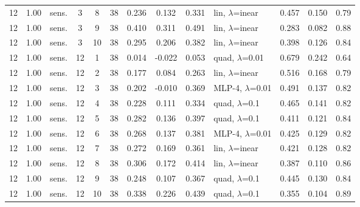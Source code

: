 \begin{scriptsize}
\begin{longtable}{cclcc c ccc l ccc}
12 & 1.00 & sens. & 3 & 8 & 38 & 0.236 & 0.132 & 0.331 & lin, $\lambda$=inear & 0.457 & 0.150 & 0.79 \\
12 & 1.00 & sens. & 3 & 9 & 38 & 0.410 & 0.311 & 0.491 & lin, $\lambda$=inear & 0.283 & 0.082 & 0.88 \\
12 & 1.00 & sens. & 3 & 10 & 38 & 0.295 & 0.206 & 0.382 & lin, $\lambda$=inear & 0.398 & 0.126 & 0.84 \\
12 & 1.00 & sens. & 12 & 1 & 38 & 0.014 & -0.022 & 0.053 & quad, $\lambda$=0.01 & 0.679 & 0.242 & 0.64 \\
12 & 1.00 & sens. & 12 & 2 & 38 & 0.177 & 0.084 & 0.263 & lin, $\lambda$=inear & 0.516 & 0.168 & 0.79 \\
12 & 1.00 & sens. & 12 & 3 & 38 & 0.202 & -0.010 & 0.369 & MLP-4, $\lambda$=0.01 & 0.491 & 0.137 & 0.82 \\
12 & 1.00 & sens. & 12 & 4 & 38 & 0.228 & 0.111 & 0.334 & quad, $\lambda$=0.1 & 0.465 & 0.141 & 0.82 \\
12 & 1.00 & sens. & 12 & 5 & 38 & 0.282 & 0.136 & 0.397 & quad, $\lambda$=0.1 & 0.411 & 0.121 & 0.84 \\
12 & 1.00 & sens. & 12 & 6 & 38 & 0.268 & 0.137 & 0.381 & MLP-4, $\lambda$=0.01 & 0.425 & 0.129 & 0.82 \\
12 & 1.00 & sens. & 12 & 7 & 38 & 0.272 & 0.169 & 0.361 & lin, $\lambda$=inear & 0.421 & 0.128 & 0.82 \\
12 & 1.00 & sens. & 12 & 8 & 38 & 0.306 & 0.172 & 0.414 & lin, $\lambda$=inear & 0.387 & 0.110 & 0.86 \\
12 & 1.00 & sens. & 12 & 9 & 38 & 0.248 & 0.107 & 0.367 & quad, $\lambda$=0.1 & 0.445 & 0.130 & 0.84 \\
12 & 1.00 & sens. & 12 & 10 & 38 & 0.338 & 0.226 & 0.439 & quad, $\lambda$=0.1 & 0.355 & 0.104 & 0.89 \\
\end{longtable}
\end{scriptsize}